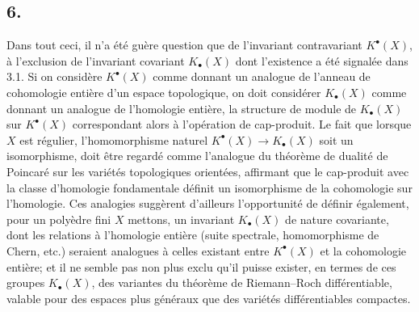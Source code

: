 \documentclass[11pt]{article}
\begin{document}
\subsection*{6.}
Dans tout ceci, il n'a \'et\'e gu\`ere question que de l'invariant contravariant $K^\bullet(X)$, \`a l'exclusion de l'invariant covariant $K_\bullet(X)$ dont l'existence a \'et\'e signal\'ee dans 3.1. Si on consid\`ere $K^\bullet(X)$ comme donnant un analogue de l'anneau de cohomologie enti\`ere d'un espace topologique, on doit consid\'erer $K_\bullet(X)$ comme donnant un analogue de l'homologie enti\`ere, la structure de module de $K_\bullet(X)$ sur $K^\bullet(X)$ correspondant alors \`a l'op\'eration de cap-produit. Le fait que lorsque $X$ est r\'egulier, l'homomorphisme naturel $K^\bullet(X)\to K_\bullet(X)$ soit un isomorphisme, doit \^etre regard\'e comme l'analogue du th\'eor\`eme de dualit\'e de Poincar\'e sur les vari\'et\'es topologiques orient\'ees, affirmant que le cap-produit avec la classe d'homologie fondamentale d\'efinit un isomorphisme de la cohomologie sur l'homologie. Ces analogies sugg\`erent d'ailleurs l'opportunit\'e de d\'efinir \'egalement, pour un poly\`edre fini $X$ mettons, un invariant $K_\bullet(X)$ de nature covariante, dont les relations \`a l'homologie enti\`ere (suite spectrale, homomorphisme de Chern, etc.) seraient analogues \`a celles existant entre $K^\bullet(X)$ et la cohomologie enti\`ere; et il ne semble pas non plus exclu qu'il puisse exister, en termes de ces groupes $K_\bullet(X)$, des variantes du th\'eor\`eme de Riemann--Roch diff\'erentiable, valable pour des espaces plus g\'en\'eraux que des vari\'et\'es diff\'erentiables compactes.
\end{document}
